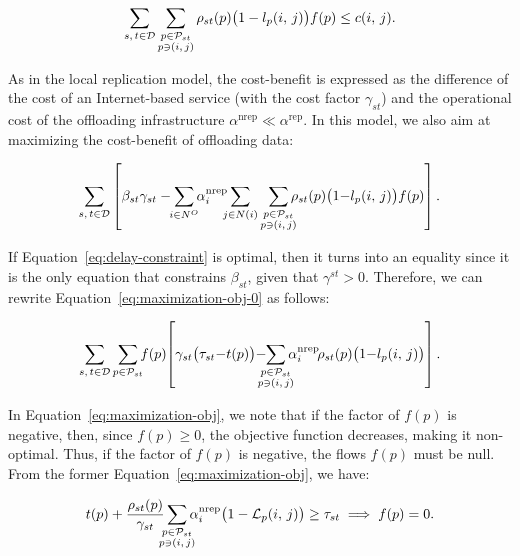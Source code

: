 \begin{equation}
    \sum_{s,\,t\in \mathcal{D}\vphantom{\mathcal{P}_{st}}} \sum_{\substack{p\in \mathcal{P}_{st}\\p\ni (i,\,j)}} \rho_{st}(p) \big(1 - l_{p}(i,\,j)\big) f(p) \leq c(i,\,j).
\end{equation}

As in the local replication model, the cost-benefit is expressed as the difference of the cost of an Internet-based service (with the cost factor $\gamma_{st}$) and the operational cost of the offloading infrastructure $\alpha^{\text{nrep}} \ll \alpha^{\text{rep}}$. In this model, we also aim at maximizing the cost-benefit of offloading data:

\begin{equation}
    \sum_{s,\,t\in \mathcal{D} \vphantom{\mathcal{P}_{st}}}\left[\beta_{st}\gamma_{st} - \smashoperator{\sum_{i\in N^{O} \vphantom{\mathcal{P}_{st}}}} \alpha_{i}^{\text{nrep}} \smashoperator[l]{\sum_{j\in N(i) \vphantom{\mathcal{P}_{st}}}} \smashoperator[r]{\sum_{\substack{p\in \mathcal{P}_{st}\\p\ni (i,\,j)}}} \rho_{st}(p) \big(1 {-} l_{p}(i,\,j)\big) f(p)\right].
\label{eq:maximization-obj-0}
\end{equation}

If Equation~\ref{eq:delay-constraint} is optimal, then it turns into an equality since it is the only equation that constrains $\beta_{st}$, given that $\gamma^{st} > 0$. Therefore, we can rewrite Equation~\ref{eq:maximization-obj-0} as follows:

\begin{equation}
    \sum_{s,\,t\in \mathcal{D} \vphantom{\mathcal{P}_{st}}} \smashoperator[r]{\sum_{p\in\mathcal{P}_{st}\vphantom{\mathcal{P}_{st}}}} f(p) \negmedspace \left[\gamma_{st}\big(\tau_{st} {-} t(p)\big) {-} \negmedspace \smashoperator{\sum_{\substack{p\in \mathcal{P}_{st}\\p\ni (i,\,j)}}}\alpha_{i}^{\text{nrep}} \! \rho_{st}(p) \big(1 {-} l_{p}(i,\,j)\big)\right].
\label{eq:maximization-obj}
\end{equation}

In Equation~\ref{eq:maximization-obj}, we note that if the factor of $f(p)$ is negative, then, since $f(p)\geq 0$, the objective function decreases, making it non-optimal. Thus, if the factor of $f(p)$ is negative, the flows $f(p)$ must be null. From the former Equation~\ref{eq:maximization-obj}, we have:

\begin{equation}
    t(p) + \frac{\rho_{st}(p)}{\gamma_{st}} \smashoperator{\sum_{\substack{p\in \mathcal{P}_{st}\\p\ni (i,\,j)}}} \alpha_{i}^{\text{nrep}} \big(1 - \mathcal{L}_{p}(i,\,j)\big) \geq \tau_{st} \implies f(p) = 0.
    \label{eq:cutoff-nrep}
\end{equation}

